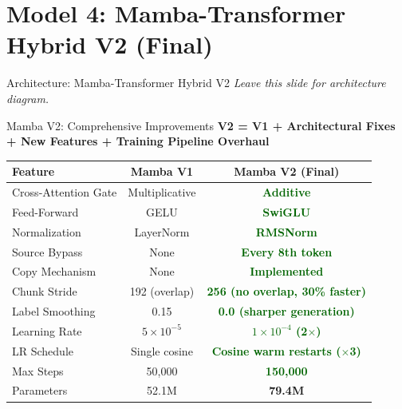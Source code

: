 \documentclass[10pt, aspectratio=169]{beamer}
\begin{document}
\section{Model 4: Mamba-Transformer Hybrid V2 (Final)}

\begin{frame}{Architecture: Mamba-Transformer Hybrid V2}
  \vspace{-0.2cm}
  {\small \textit{Leave this slide for architecture diagram.}}
\end{frame}

\begin{frame}{Mamba V2: Comprehensive Improvements}
  {\small\textbf{V2 = V1 + Architectural Fixes + New Features + Training Pipeline Overhaul}}

  \vspace{0.1cm}

  \begin{table}
    \centering
    \footnotesize
    \renewcommand{\arraystretch}{1.1}
    \begin{tabular}{lcc}
      \toprule
      \textbf{Feature} & \textbf{Mamba V1} & \textbf{Mamba V2 (Final)} \\
      \midrule
      Cross-Attention Gate & Multiplicative & \textcolor{darkgreen}{\textbf{Additive}} \\
      Feed-Forward & GELU & \textcolor{darkgreen}{\textbf{SwiGLU}} \\
      Normalization & LayerNorm & \textcolor{darkgreen}{\textbf{RMSNorm}} \\
      Source Bypass & None & \textcolor{darkgreen}{\textbf{Every 8th token}} \\
      Copy Mechanism & None & \textcolor{darkgreen}{\textbf{Implemented}} \\
      Chunk Stride & 192 (overlap) & \textcolor{darkgreen}{\textbf{256 (no overlap, 30\% faster)}} \\
      Label Smoothing & 0.15 & \textcolor{darkgreen}{\textbf{0.0 (sharper generation)}} \\
      Learning Rate & $5 \times 10^{-5}$ & \textcolor{darkgreen}{\textbf{$1 \times 10^{-4}$ (2$\times$)}} \\
      LR Schedule & Single cosine & \textcolor{darkgreen}{\textbf{Cosine warm restarts ($\times$3)}} \\
      Max Steps & 50,000 & \textcolor{darkgreen}{\textbf{150,000}} \\
      Parameters & 52.1M & \textbf{79.4M} \\
      \bottomrule
    \end{tabular}
  \end{table}
\end{frame}
\end{document}
